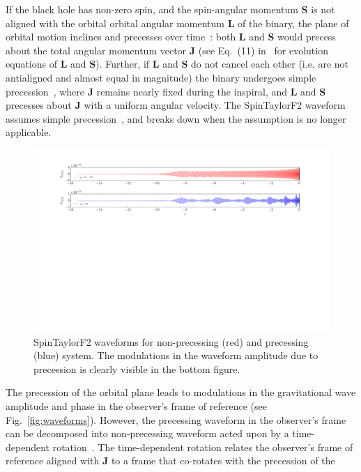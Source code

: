 If the black hole has non-zero spin, and the spin-angular momentum $\mathbf{S}$
is  not aligned with the orbital orbital angular momentum $\mathbf{L}$ of the
binary, the plane of orbital motion inclines and precesses over
time~\cite{Apostolatos1994}: both $\mathbf{L}$ and $\mathbf{S}$  would precess
about the total angular momentum vector $\mathbf{J}$ (see Eq.~(11)
in~\cite{Apostolatos1994} for evolution equations of $\mathbf{L}$ and
$\mathbf{S}$). Further, if $\mathbf{L}$ and $\mathbf{S}$ do not cancel each
other (i.e. are not antialigned and almost equal in magnitude)  the binary
undergoes simple precession~\cite{Apostolatos1994}, where $\mathbf{J}$ remains
nearly fixed during the inspiral, and $\mathbf{L}$ and $\mathbf{S}$ precesses
about $\mathbf{J}$ with a uniform angular velocity. The SpinTaylorF2 waveform
assumes simple precession~\cite{Lundgren2014}, and breaks down  when the
assumption is no longer applicable.
\label{fig:waveforms} 
\begin{figure}[t]
\includegraphics[width=\textwidth]{./images/TD_waveforms_comparison.pdf}
\caption{SpinTaylorF2 waveforms for non-precessing (red) and precessing (blue) system. 
The modulations in the waveform amplitude due to precession is clearly visible in the 
bottom figure.} 
\centering 
\end{figure}
The precession of the orbital plane leads to modulations in the gravitational
wave amplitude and phase in the observer's frame of reference (see Fig.~\ref{fig:waveforms}).
However, the precessing waveform in the observer's frame can be decomposed into
non-precessing waveform acted upon by a time-dependent rotation~\cite{Boyle2011,
Rotation}. The time-dependent rotation relates the observer's frame of reference
aligned with $\mathbf{J}$ to a frame that co-rotates with the precession of the
